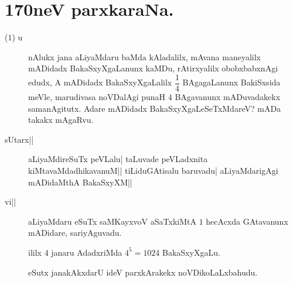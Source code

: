 \chapter{170neV parxkaraNa.}


\begin{description}
\item[($1$) u] nAlukx jana aLiyaMdaru baMda kAladalilx, mAvana maneyalilx
  mADidadx BakaSxyXgaLanunx kaMDu, rAtirxyalilx obobxbabxnAgi edudx, A
  mADidadx BakaSxyXgaLalilx $\dfrac{1}{4}$ BAgagaLanunx BakiSxsida
  meVle, marudivasa noVDalAgi punaH $4$ BAgavanunx mADuvadakekx
  samanAgitutx. Adare mADidadx BakaSxyXgaLeSeTxMdareV? mADa takakx mAgaRvu.

\item[sUtarx||] aLiyaMdireSuTx peVLalu| taLuvade peVLadxnita
  kiMtavaMdadhikavanuM|| tiLiduGAtisalu baruvadu| aLiyaMdarigAgi
  mADidaMthA BakaSxyXM||

\item[vi||] aLiyaMdaru eSuTx saMKayxvoV aSaTxkiMtA $1$ hecAcxda
  GAtavanunx mADidare, sariyAguvadu.

  ililx $4$ janaru AdadxriMda $4^5= 1024$ BakaSxyXgaLu.

  eSutx janakAkxdarU ideV parxkArakekx noVDikoLaLxbahudu.
\end{description}


